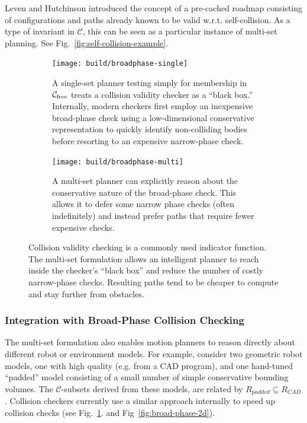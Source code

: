 Leven and Hutchinson \cite{leven2000changing}
introduced the concept of a pre-cached roadmap consisting of
configurations and paths already known to be valid w.r.t.
self-collision.
As a type of invariant in $\mathcal{C}$,
this can be seen as a particular instance of multi-set planning.
See Fig.~\ref{fig:self-collision-example}.

\begin{figure}
\centering

\begin{subfigure}[t]{\linewidth}
\centering
\texttt{[image: build/broadphase-single]}
\caption{A single-set planner testing simply for membership in
  $\mathcal{C}_{\mbox{\scriptsize free}}$
  treats a collision validity checker as a
  ``black box.''
  Internally,
  modern checkers first employ an inexpensive broad-phase check
  using a low-dimensional conservative representation
  to quickly identify non-colliding bodies before
  resorting to an expensive narrow-phase check.}
\end{subfigure}

\vspace{0.2in}

\begin{subfigure}[t]{\linewidth}
\centering
\texttt{[image: build/broadphase-multi]}
\caption{A multi-set planner can explicitly reason about the
  conservative nature of the broad-phase check.
  This allows it to defer some narrow phase checks
  (often indefinitely)
  and instead prefer paths that require fewer expensive checks.}
\end{subfigure}

\caption{Collision validity checking is a commonly used
  indicator function.
  The multi-set formulation allows an intelligent planner to
  reach inside the checker's ``black box'' and reduce the number
  of costly narrow-phase checks.
  Resulting paths tend to be cheaper to compute and
  stay further from obstacles.}
\label{fig:broad-phase}
\end{figure}

\subsubsection*{Integration with Broad-Phase Collision Checking}
\label{subsec:broad-phase}

The multi-set formulation also enables motion planners to
reason directly about different robot or environment models.
For example, consider two geometric robot models,
one with high quality (e.g. from a CAD program),
and one hand-tuned ``padded'' model consisting of 
a small number of simple conservative bounding volumes.
The $\mathcal{C}$-subsets derived from these models,
are related by $R_{padded} \subseteq R_{CAD}$.
Collision checkers currently use a similar approach internally
to speed up collision checks (see Fig.~\ref{fig:broad-phase}.
and Fig~\ref{fig:broad-phase-2d}).

